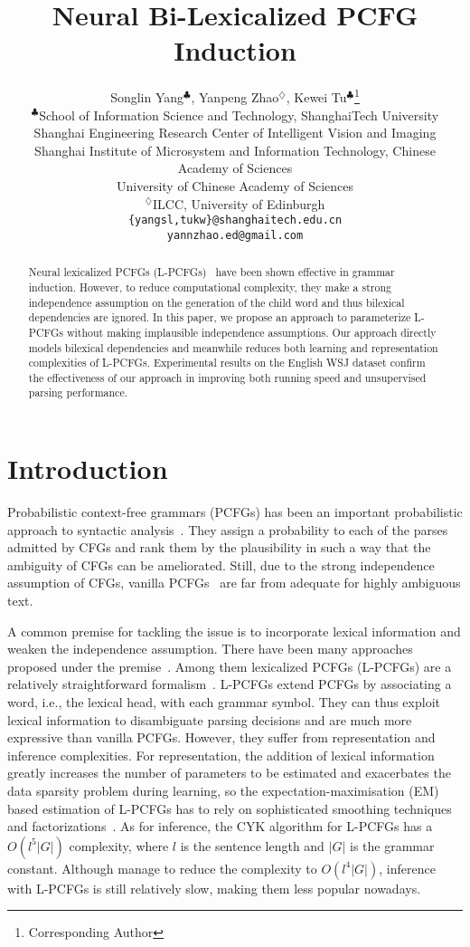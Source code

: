 \documentclass[11pt,a4paper]{article}
\title{Neural Bi-Lexicalized PCFG Induction}
\author{Songlin Yang$^{\clubsuit}$, Yanpeng Zhao$^{\diamondsuit}$, Kewei Tu$^{\clubsuit}$\thanks{\; Corresponding Author}\\
  $^{\clubsuit}$School of Information Science and Technology, ShanghaiTech University \\
  \textsuperscript{}{Shanghai Engineering Research Center of Intelligent Vision and Imaging}\\
  \textsuperscript{}{Shanghai Institute of Microsystem and Information Technology, Chinese Academy of Sciences}\\
    \textsuperscript{}{University of Chinese Academy of Sciences}\\
 $^{\diamondsuit}${ILCC, University of Edinburgh}\\
    {\tt \{yangsl,tukw\}@shanghaitech.edu.cn}\\
    {\tt yannzhao.ed@gmail.com}
 }
\date{}
\begin{document}
\maketitle
\begin{abstract}
Neural lexicalized PCFGs (L-PCFGs)~\citep{zhu-etal-2020-return} have been shown effective in grammar induction. However, to reduce computational complexity, they make a strong independence assumption on the generation of the child word and thus bilexical dependencies are ignored.
In this paper, we propose an approach to parameterize L-PCFGs without making implausible independence assumptions. Our approach directly models bilexical dependencies and meanwhile reduces both learning and representation complexities of L-PCFGs.  Experimental results on the English WSJ dataset confirm the effectiveness of our approach in improving both running speed and unsupervised parsing performance.
\end{abstract}

\section{Introduction}

Probabilistic context-free grammars (PCFGs) has been an important probabilistic approach to syntactic analysis~\citep{lari1990estimation,jelinek1992}.
They assign a probability to each of the parses admitted by CFGs and rank them by the plausibility in such a way that the ambiguity of CFGs can be ameliorated.
Still, due to the strong independence assumption of CFGs, 
vanilla PCFGs~\citep{Charniak1996} are far from adequate for highly ambiguous text.

A common premise for tackling the issue is to incorporate lexical information and weaken the independence assumption.
There have been many approaches proposed under the premise~\citep{magerman-1995-statistical,collins-1997-three,johnson-1998-pcfg,klein-manning-2003-accurate}.
Among them lexicalized PCFGs (L-PCFGs) are a relatively straightforward formalism~\citep{collins-2003-head}.
L-PCFGs extend PCFGs by associating a word, i.e., the lexical head, with each grammar symbol.
They can thus exploit lexical information to disambiguate parsing decisions and are much more expressive than vanilla PCFGs. However, they suffer from representation and inference  complexities.
For representation, the addition of lexical information 
greatly increases the number of parameters to be estimated and exacerbates the data sparsity problem during learning,
so the expectation-maximisation (EM) based estimation of L-PCFGs has to rely on sophisticated smoothing techniques and factorizations~\citep{collins-2003-head}. As for inference, the  CYK algorithm for L-PCFGs has a $O(l^5|G|)$ complexity, where $l$ is the sentence length and $|G|$ is the grammar constant. Although \citet{eisner-satta-1999-efficient} manage to reduce the complexity to $O(l^4|G|)$, inference with L-PCFGs is still relatively slow, making them less popular nowadays.
\end{document}
